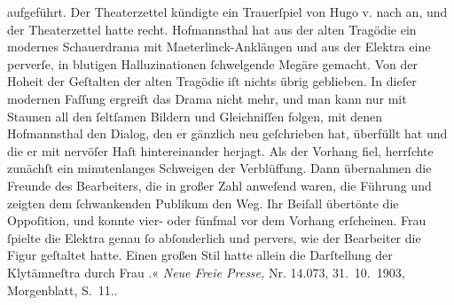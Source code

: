 \begin{ledgroupsized}[t]{13cm}
{{{                           aufgeführt. Der Theaterzettel kündigte ein Trauerſpiel von Hugo v.
                               nach  an, und
                           der Theaterzettel hatte recht. Hofmannsthal hat aus der alten
                           Tragödie ein modernes Schauerdrama mit Maeterlinck-Anklängen und
                        aus der Elektra eine perverſe, in blutigen Halluzinationen ſchwelgende
                        Megäre gemacht. Von der Hoheit der Geſtalten der alten Tragödie iſt nichts
                        übrig geblieben. In dieſer modernen Faſſung ergreift das Drama nicht mehr,
                        und man kann nur mit Staunen all den ſeltſamen Bildern und Gleichniſſen
                        folgen, mit denen Hofmannsthal den Dialog, den er gänzlich neu
                        geſchrieben hat, überfüllt hat und die er mit nervöſer Haſt hintereinander
                        herjagt. Als der Vorhang fiel, herrſchte zunächſt ein minutenlanges
                        Schweigen der Verblüffung. Dann übernahmen die Freunde des Bearbeiters, die
                        in großer Zahl anweſend waren, die Führung und zeigten dem ſchwankenden
                        Publikum den Weg. Ihr Beiſall übertönte die Oppoſition, und
                            konnte vier- oder fünfmal vor dem Vorhang
                           erſcheinen. Frau  ſpielte die Elektra genau ſo
                        abſonderlich und pervers, wie der Bearbeiter die Figur geſtaltet hatte.
                        Einen großen Stil hatte allein die Darſtellung der Klytämneſtra durch Frau
                           .« \emph{Neue
                           Freie Presse,} Nr. 14.073, 31. 10. 1903,
                        Morgenblatt, S. 11.}}}\label{K_L01334-1h}.\pend
           

\end{ledgroupsized}
